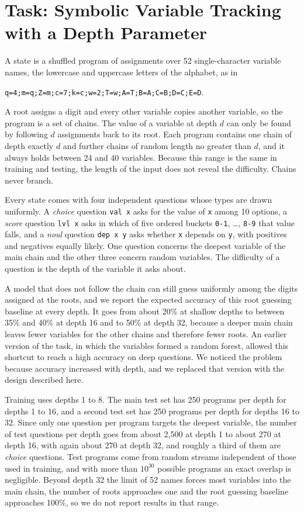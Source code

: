\documentclass{article}
\begin{document}
\section{Task: Symbolic Variable Tracking with a Depth Parameter}
\label{sec:task}

A state is a shuffled program of assignments over 52 single-character variable names, the lowercase and uppercase letters of the alphabet, as in
\begin{center}
\texttt{q=4;m=q;Z=m;c=7;k=c;w=2;T=w;A=T;B=A;C=B;D=C;E=D}.
\end{center}
A root assigns a digit and every other variable copies another variable, so the program is a set of chains. The value of a variable at depth $d$ can only be found by following $d$ assignments back to its root. Each program contains one chain of depth exactly $d$ and further chains of random length no greater than $d$, and it always holds between 24 and 40 variables. Because this range is the same in training and testing, the length of the input does not reveal the difficulty. Chains never branch.

Every state comes with four independent questions whose types are drawn uniformly. A \emph{choice} question \texttt{val x} asks for the value of \texttt{x} among 10 options, a \emph{score} question \texttt{lvl x} asks in which of five ordered buckets \texttt{0-1}, \dots, \texttt{8-9} that value falls, and a \emph{noul} question \texttt{dep x y} asks whether \texttt{x} depends on \texttt{y}, with positives and negatives equally likely. One question concerns the deepest variable of the main chain and the other three concern random variables. The difficulty of a question is the depth of the variable it asks about.

A model that does not follow the chain can still guess uniformly among the digits assigned at the roots, and we report the expected accuracy of this root guessing baseline at every depth. It goes from about 20\% at shallow depths to between 35\% and 40\% at depth 16 and to 50\% at depth 32, because a deeper main chain leaves fewer variables for the other chains and therefore fewer roots. An earlier version of the task, in which the variables formed a random forest, allowed this shortcut to reach a high accuracy on deep questions. We noticed the problem because accuracy increased with depth, and we replaced that version with the design described here.

Training uses depths 1 to 8. The main test set has 250 programs per depth for depths 1 to 16, and a second test set has 250 programs per depth for depths 16 to 32. Since only one question per program targets the deepest variable, the number of test questions per depth goes from about 2{,}500 at depth 1 to about 270 at depth 16, with again about 270 at depth 32, and roughly a third of them are \emph{choice} questions. Test programs come from random streams independent of those used in training, and with more than $10^{30}$ possible programs an exact overlap is negligible. Beyond depth 32 the limit of 52 names forces most variables into the main chain, the number of roots approaches one and the root guessing baseline approaches 100\%, so we do not report results in that range.
\end{document}
